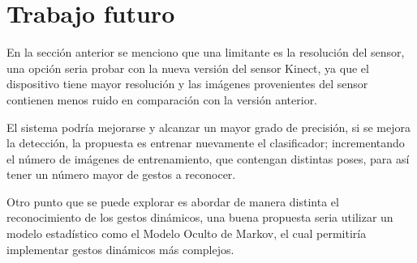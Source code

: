 

\section{Trabajo futuro}\label{futureWork}  

En la sección anterior se menciono que una limitante es la resolución del sensor, una opción seria probar con la nueva versión del sensor Kinect, ya que el dispositivo tiene mayor resolución y las imágenes provenientes del sensor contienen menos ruido en comparación con la versión anterior. 

El sistema podría mejorarse y alcanzar un mayor grado de precisión, si se mejora la detección, la propuesta es entrenar nuevamente el clasificador; incrementando el número de imágenes de entrenamiento, que contengan distintas poses, para así tener un número mayor de gestos a reconocer.

Otro punto que se puede explorar es abordar de manera distinta el reconocimiento de los gestos dinámicos, una buena propuesta seria utilizar un modelo estadístico como el Modelo Oculto de Markov, el cual permitiría implementar gestos dinámicos más complejos.  

\newpage
